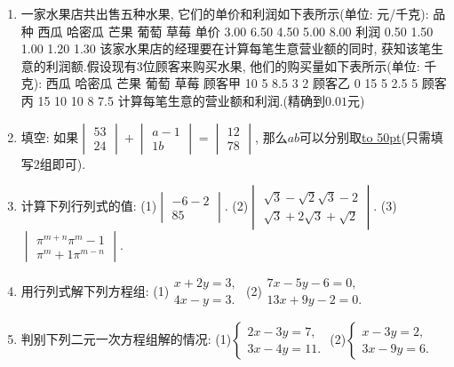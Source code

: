 \documentclass[10pt,a4paper]{article}
\newcommand{\blank}[1]{\underline{\hbox to #1pt{}}}
\begin{document}
\begin{enumerate}[1.]
\item 一家水果店共出售五种水果, 它们的单价和利润如下表所示(单位: 元/千克):
品  种	西瓜	哈密瓜	芒果	葡萄	草莓
单价	3.00	6.50	4.50	5.00	8.00
利润	0.50	1.50	1.00	1.20	1.30
该家水果店的经理要在计算每笔生意营业额的同时, 获知该笔生意的利润额.假设现有$3$位顾客来购买水果, 他们的购买量如下表所示(单位: 千克):
西瓜	哈密瓜	芒果	葡萄	草莓
顾客甲	10	5	8.5	3	2
顾客乙	0	15	5	2.5	5
顾客丙	15	10	10	8	7.5
计算每笔生意的营业额和利润.(精确到$0.01$元)
\item 填空:
如果$\begin{vmatrix}
    5  3  \\2  4  \end{vmatrix}+\begin{vmatrix}
    a  -1  \\1  b  \end{vmatrix}=\begin{vmatrix}
    1  2  \\7  8  \end{vmatrix}$, 那么$ab$可以分别取\blank{50}(只需填写$2$组即可).
\item 计算下列行列式的值:
(1)$\begin{vmatrix}
    -6  -2  \\8  5  \end{vmatrix}$. (2)$\begin{vmatrix}
    \sqrt 3-\sqrt 2  \sqrt 3-2  \\\sqrt 3+2  \sqrt 3+\sqrt 2  \end{vmatrix}$.
(3)$\begin{vmatrix}
    \pi ^{m+n}  \pi ^m-1  \\\pi ^m+1  \pi ^{m-n}  \end{vmatrix}$.
\item 用行列式解下列方程组:
(1)$\begin{matrix}
    x+2y=3,  \\4x-y=3.  \end{matrix}$ (2)$\begin{matrix}
    7x-5y-6=0,  \\13x+9y-2=0.  \end{matrix}$
\item 判别下列二元一次方程组解的情况:
(1)$\begin{cases}
    2x-3y=7,  \\3x-4y=11.  \end{cases}$ (2)$\begin{cases}
    x-3y=2,  \\3x-9y=6.  \end{cases}$

\end{enumerate}
\end{document}
